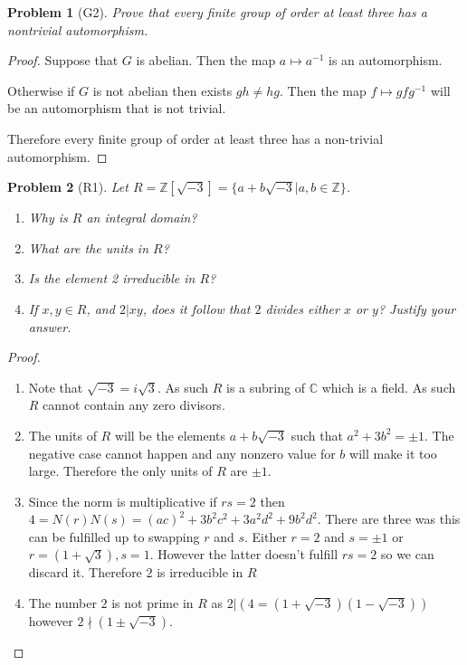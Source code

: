 \documentclass[10pt]{article}
\newcommand{\sk}{\vskip 10mm}
\newcommand{\bb}[1]{\mathbb{#1}}
\theoremstyle{plain}
\newtheorem{problem}{Problem}
\theoremstyle{remark}
\begin{document}
\sk

\begin{problem}[G2]
  Prove that every finite group of order at least three has a nontrivial
  automorphism.
\end{problem}

\begin{proof}
  Suppose that $G$ is abelian. Then the map $a\mapsto a^{-1}$ is an automorphism.

  Otherwise if $G$ is not abelian then exists $gh\neq hg$. Then the map
  $f\mapsto gfg^{-1}$ will be an automorphism that is not trivial.

  Therefore every finite group of order at least three has a non-trivial
  automorphism.
\end{proof}

\sk

\begin{problem}[R1]
  Let $R=\bb{Z}[\sqrt{-3}]=\{a+b\sqrt{-3}|a,b\in\bb{Z}\}$.
  \begin{enumerate}
  \item Why is $R$ an integral domain?
  \item What are the units in $R$?
  \item Is the element 2 irreducible in $R$?
  \item If $x,y\in R$, and $2|xy$, does it follow that $2$ divides
    either $x$ or $y$? Justify your answer.
  \end{enumerate}
\end{problem}

\begin{proof}
  \begin{enumerate}
  \item Note that $\sqrt{-3}=i\sqrt{3}$. As such $R$ is a subring of $\bb{C}$
    which is a field. As such $R$ cannot contain any zero divisors.
  \item The units of $R$ will be the elements $a+b\sqrt{-3}$ such that
    $a^2+3b^2=\pm 1$. The negative case cannot happen and any nonzero value for $b$ will
    make it too large. Therefore the only units of $R$ are $\pm 1$.
  \item Since the norm is multiplicative if $rs=2$ then
    $4=N(r)N(s)=(ac)^2+3b^2c^2+3a^2d^2+9b^2d^2$. There are three was this can be fulfilled
    up to swapping $r$ and $s$. Either $r=2$ and $s=\pm 1$ or $r=(1+\sqrt{3}),s=1$.
    However the latter doesn't fulfill $rs=2$ so we can discard it. Therefore
    $2$ is irreducible in $R$
  \item The number $2$ is not prime in $R$ as $2|(4=(1+\sqrt{-3})(1-\sqrt{-3}))$
    however $2\nmid (1\pm \sqrt{-3})$.
  \end{enumerate}
\end{proof}
\end{document}
